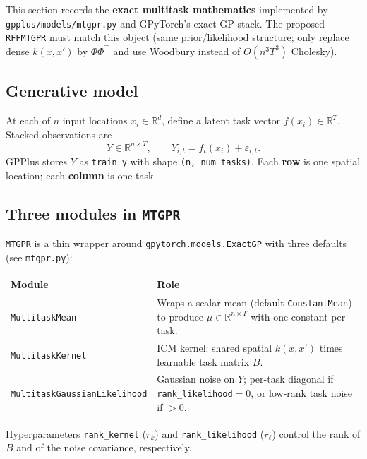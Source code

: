 \documentclass[11pt]{article}
\theoremstyle{plain}
\newcommand{\Ph}{\Phi}
\begin{document}
This section records the \textbf{exact multitask mathematics} implemented by
\texttt{gpplus/models/mtgpr.py} and GPyTorch's exact-GP stack.
The proposed \texttt{RFFMTGPR} must match this object (same prior/likelihood structure;
only replace dense $k(x,x')$ by $\Ph\Ph^\top$ and use Woodbury instead of $O(n^3T^3)$ Cholesky).

\subsection{Generative model}

At each of $n$ input locations $x_i \in \mathbb{R}^d$, define a latent task vector
$f(x_i) \in \mathbb{R}^T$. Stacked observations are
\begin{equation}
  Y \in \mathbb{R}^{n \times T}, \qquad Y_{i,t} = f_t(x_i) + \varepsilon_{i,t}.
\end{equation}
GPPlus stores $Y$ as \texttt{train\_y} with shape \texttt{(n, num\_tasks)}.
Each \textbf{row} is one spatial location; each \textbf{column} is one task.

\subsection{Three modules in \texttt{MTGPR}}

\texttt{MTGPR} is a thin wrapper around \texttt{gpytorch.models.ExactGP} with three defaults
(see \texttt{mtgpr.py}):

\begin{center}
\renewcommand{\arraystretch}{1.25}
\begin{tabular}{@{}p{}p{}@{}}
\toprule
\textbf{Module} & \textbf{Role} \\
\midrule
\texttt{MultitaskMean} & Wraps a scalar mean (default \texttt{ConstantMean}) to produce
$\mu \in \mathbb{R}^{n \times T}$ with one constant per task. \\
\texttt{MultitaskKernel} & ICM kernel: shared spatial $k(x,x')$ times learnable task matrix $B$. \\
\texttt{MultitaskGaussianLikelihood} & Gaussian noise on $Y$; per-task diagonal if
\texttt{rank\_likelihood}$=0$, or low-rank task noise if $>0$. \\
\bottomrule
\end{tabular}
\end{center}

Hyperparameters \texttt{rank\_kernel} ($r_k$) and \texttt{rank\_likelihood} ($r_\ell$)
control the rank of $B$ and of the noise covariance, respectively.
\end{document}

